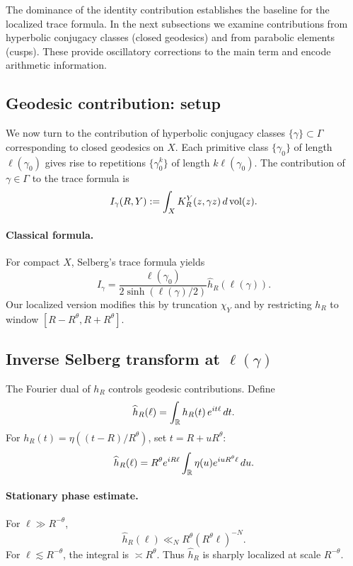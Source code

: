The dominance of the identity contribution establishes the baseline for the localized trace formula. In the next subsections we examine contributions from hyperbolic conjugacy classes (closed geodesics) and from parabolic elements (cusps). These provide oscillatory corrections to the main term and encode arithmetic information.

\subsection{Geodesic contribution: setup}\label{subsec:geom-geodesic}

We now turn to the contribution of hyperbolic conjugacy classes $\{\gamma\}\subset\Gamma$ corresponding to closed geodesics on $X$. Each primitive class $\{\gamma_0\}$ of length $\ell(\gamma_0)$ gives rise to repetitions $\{\gamma_0^k\}$ of length $k\ell(\gamma_0)$. The contribution of $\gamma\in\Gamma$ to the trace formula is
\[
I_\gamma(R,Y) := \int_X K_R^Y(z,\gamma z)\,d\operatorname{vol}(z).
\]

\paragraph{Classical formula.} For compact $X$, Selberg’s trace formula yields
\[
I_\gamma = \frac{\ell(\gamma_0)}{2\sinh(\ell(\gamma)/2)}\widehat{h}_R(\ell(\gamma)).
\]
Our localized version modifies this by truncation $\chi_Y$ and by restricting $h_R$ to window $[R-R^\theta,R+R^\theta]$.

\subsection{Inverse Selberg transform at $\ell(\gamma)$}\label{subsec:geom-transform}

The Fourier dual of $h_R$ controls geodesic contributions. Define
\[
\widehat{h}_R(\ell) = \int_{\mathbb{R}} h_R(t)\, e^{i t \ell}\,dt.
\]
For $h_R(t)=\eta((t-R)/R^\theta)$, set $t=R+uR^\theta$:
\[
\widehat{h}_R(\ell) = R^\theta e^{iR\ell}\int_{\mathbb{R}} \eta(u) e^{iuR^\theta \ell}\,du.
\]

\paragraph{Stationary phase estimate.} For $\ell\gg R^{-\theta}$,
\[
\widehat{h}_R(\ell) \ll_N R^\theta (R^\theta \ell)^{-N}.
\]
For $\ell\lesssim R^{-\theta}$, the integral is $\asymp R^\theta$. Thus $\widehat{h}_R$ is sharply localized at scale $R^{-\theta}$.

